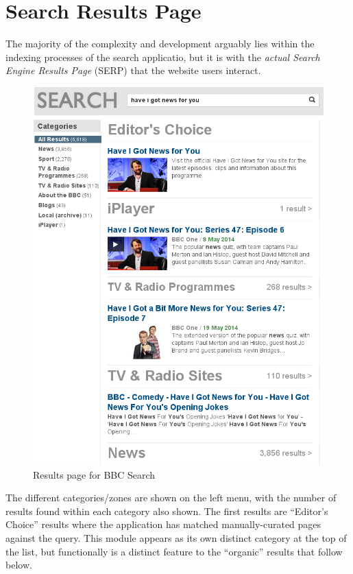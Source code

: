 \section{Search Results Page}
\label{sec:search-results-page}

The majority of the complexity and development arguably lies within
the indexing processes of the search applicatio, but it is with the
\emph{actual Search Engine Results Page} (SERP) that the website users interact.

\begin{figure}
  \begin{center}
    \includegraphics[width=\linewidth]{results-page.png}
  \end{center}
  \caption{Results page for BBC Search}
  \label{fig:search-page}
\end{figure}

The different categories/zones are shown on the left menu, with the
number of results found within each category also shown. The first results
are ``Editor's Choice'' results where the application
has matched manually-curated pages against the query. This module appears
as its own distinct category at the top of the list, but functionally
is a distinct feature to the ``organic'' results that follow below.

